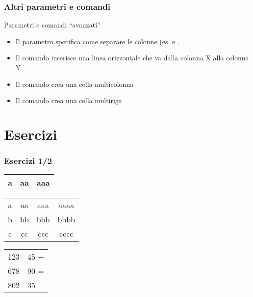 \begin{frame}[fragile]
 
  \frametitle{Altri parametri e comandi}

  Parametri e comandi ``avanzati''
  
  \begin{itemize}
    \item Il parametro  specifica come separare le colonne (es.  e .
    \item Il comando  inserisce una linea
orizzontale che va dalla colonna X alla colonna Y.
    \item Il comando  crea una cella multicolonna 
    \item Il comando  crea una cella multiriga
  \end{itemize}

\end{frame}
\section{Esercizi}
\begin{frame}
 
 \frametitle{Esercizi 1/2}
  
  \begin{centering}

  \begin{tabular}{|p{}|l|p{2cm}|}
   \hline
   a & aa & aaa\\
   \hline
  \end{tabular}
  \vspace{1cm}

  \begin{tabular}{|c|c|c|c|}
   \hline
   a & aa & aaa & aaaa\\
   \cline{2-4}
   b & bb & bbb & bbbb\\
   \cline{3-4}
   c & cc & ccc & cccc\\
   \hline
  \end{tabular}
  \vspace{1cm}

  \begin{tabular}{l@{,}l@{}}
   123 & 45 + \\
   678 & 90 = \\
   \hline
   802 & 35
  \end{tabular}

  \end{centering}

\end{frame}
